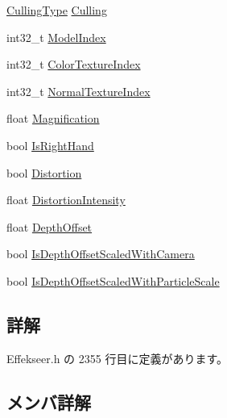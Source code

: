 \begin{DoxyCompactItemize}
\item 
\mbox{\hyperlink{namespace_effekseer_a3ae9542a9c9309ec191be1ae5e6dc00a}{Culling\+Type}} \mbox{\hyperlink{struct_effekseer_1_1_model_renderer_1_1_node_parameter_a8ead63177a2cb7f0797f646e682db538}{Culling}}
\item 
int32\+\_\+t \mbox{\hyperlink{struct_effekseer_1_1_model_renderer_1_1_node_parameter_a8d90f2d66294e2005cc737afbfa97dea}{Model\+Index}}
\item 
int32\+\_\+t \mbox{\hyperlink{struct_effekseer_1_1_model_renderer_1_1_node_parameter_abdfcf0e63df9aff535effe2eaedfbdd3}{Color\+Texture\+Index}}
\item 
int32\+\_\+t \mbox{\hyperlink{struct_effekseer_1_1_model_renderer_1_1_node_parameter_abad17228020f70a3f2ac1d05c25f73ac}{Normal\+Texture\+Index}}
\item 
float \mbox{\hyperlink{struct_effekseer_1_1_model_renderer_1_1_node_parameter_a2795f9c10fd867586eaf942ddb772364}{Magnification}}
\item 
bool \mbox{\hyperlink{struct_effekseer_1_1_model_renderer_1_1_node_parameter_aa6a88952b1eb5e94d718a8523a1082fc}{Is\+Right\+Hand}}
\item 
bool \mbox{\hyperlink{struct_effekseer_1_1_model_renderer_1_1_node_parameter_adb4920c1697cfdee2cd7fff84a7ebc11}{Distortion}}
\item 
float \mbox{\hyperlink{struct_effekseer_1_1_model_renderer_1_1_node_parameter_aebe9d866f67f827bcd6fcba2721f57ac}{Distortion\+Intensity}}
\item 
float \mbox{\hyperlink{struct_effekseer_1_1_model_renderer_1_1_node_parameter_a53b8a8653231f5f9a7d4721e76f78f36}{Depth\+Offset}}
\item 
bool \mbox{\hyperlink{struct_effekseer_1_1_model_renderer_1_1_node_parameter_a58602ab7f71d1a8ead8a7e9b0168b5e7}{Is\+Depth\+Offset\+Scaled\+With\+Camera}}
\item 
bool \mbox{\hyperlink{struct_effekseer_1_1_model_renderer_1_1_node_parameter_a4826b66cd9c8841881d1e405b4d9ef16}{Is\+Depth\+Offset\+Scaled\+With\+Particle\+Scale}}
\end{DoxyCompactItemize}


\subsection{詳解}


 Effekseer.\+h の 2355 行目に定義があります。



\subsection{メンバ詳解}
\mbox{\label{struct_effekseer_1_1_model_renderer_1_1_node_parameter_a412adbcede66578e67fc52338df61843}} 
